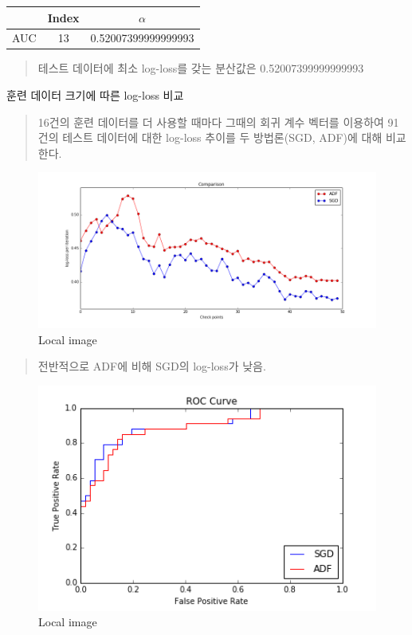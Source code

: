 \documentclass[11pt]{article}
\makeatletter
\def\maxwidth{\ifdim\Gin@nat@width>\linewidth\linewidth
    \else\Gin@nat@width\fi}
\let\Oldincludegraphics\includegraphics
\renewcommand{\includegraphics}[1]{\Oldincludegraphics[width=.8\maxwidth]{#1}}
\makeatother
\begin{document}
    \begin{longtable}[]{@{}lcc@{}}
\toprule
& Index & \(\alpha\)\tabularnewline
\midrule
\endhead
AUC & 13 & 0.52007399999999993\tabularnewline
\bottomrule
\end{longtable}

\begin{quote}
테스트 데이터에 최소 log-loss를 갖는 분산값은 0.52007399999999993
\end{quote}

    훈련 데이터 크기에 따른 log-loss 비교

    \begin{quote}
16건의 훈련 데이터를 더 사용할 때마다 그때의 회귀 계수 벡터를 이용하여
91건의 테스트 데이터에 대한 log-loss 추이를 두 방법론(SGD, ADF)에 대해
비교한다.
\end{quote}

    \begin{figure}[htbp]
\centering
\includegraphics{./images/step_vali_comparison_T.png}
\caption{Local image}
\end{figure}

    \begin{quote}
전반적으로 ADF에 비해 SGD의 log-loss가 낮음.
\end{quote}

    \begin{figure}[htbp]
\centering
\includegraphics{./images/step_vali_roc_T.png}
\caption{Local image}
\end{figure}
\end{document}
